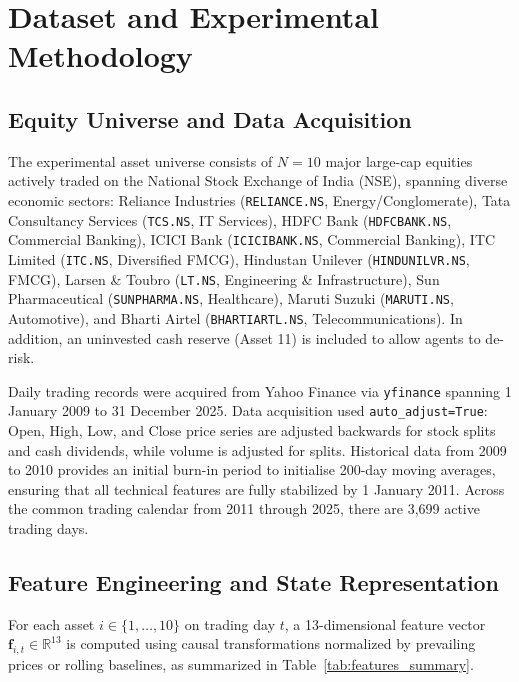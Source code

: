 \chapter{Dataset and Experimental Methodology}
\label{ch:data}

\section{Equity Universe and Data Acquisition}
The experimental asset universe consists of $N = 10$ major large-cap equities actively traded on the National Stock Exchange of India (NSE), spanning diverse economic sectors: Reliance Industries (\texttt{RELIANCE.NS}, Energy/Conglomerate), Tata Consultancy Services (\texttt{TCS.NS}, IT Services), HDFC Bank (\texttt{HDFCBANK.NS}, Commercial Banking), ICICI Bank (\texttt{ICICIBANK.NS}, Commercial Banking), ITC Limited (\texttt{ITC.NS}, Diversified FMCG), Hindustan Unilever (\texttt{HINDUNILVR.NS}, FMCG), Larsen \& Toubro (\texttt{LT.NS}, Engineering \& Infrastructure), Sun Pharmaceutical (\texttt{SUNPHARMA.NS}, Healthcare), Maruti Suzuki (\texttt{MARUTI.NS}, Automotive), and Bharti Airtel (\texttt{BHARTIARTL.NS}, Telecommunications). In addition, an uninvested cash reserve (Asset 11) is included to allow agents to de-risk.

Daily trading records were acquired from Yahoo Finance via \texttt{yfinance} spanning 1 January 2009 to 31 December 2025. Data acquisition used \texttt{auto\_adjust=True}: Open, High, Low, and Close price series are adjusted backwards for stock splits and cash dividends, while volume is adjusted for splits. Historical data from 2009 to 2010 provides an initial burn-in period to initialise 200-day moving averages, ensuring that all technical features are fully stabilized by 1 January 2011. Across the common trading calendar from 2011 through 2025, there are 3,699 active trading days.

\section{Feature Engineering and State Representation}
For each asset $i \in \{1, \dots, 10\}$ on trading day $t$, a 13-dimensional feature vector $\mathbf{f}_{i,t} \in \mathbb{R}^{13}$ is computed using causal transformations normalized by prevailing prices or rolling baselines, as summarized in Table~\ref{tab:features_summary}.

